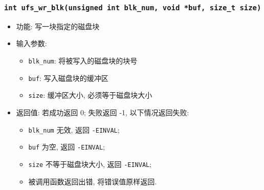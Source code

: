 \documentclass[nofonts]{ctexart}
\begin{document}
  \subsubsection[\texttt{ufs\_wr\_blk}]{\texttt{int ufs\_wr\_blk(unsigned int blk\_num, void *buf, size\_t size)}}
  \begin{itemize}
\item
  功能: 写一块指定的磁盘块
\item
  输入参数:

  \begin{itemize}
  \item
    \texttt{blk\_num}: 将被写入的磁盘块的块号
  \item
    \texttt{buf}: 写入磁盘块的缓冲区
  \item
    \texttt{size}: 缓冲区大小, 必须等于磁盘块大小
  \end{itemize}
\item
  返回值: 若成功返回 0; 失败返回 -1, 以下情况返回失败:

  \begin{itemize}
  \item
    \texttt{blk\_num} 无效, 返回 \texttt{-EINVAL};
  \item
    \texttt{buf} 为空, 返回 \texttt{-EINVAL};
  \item
    \texttt{size} 不等于磁盘块大小, 返回 \texttt{-EINVAL};
  \item
    被调用函数返回出错, 将错误值原样返回.
  \end{itemize}
  \end{itemize}
\end{document}
